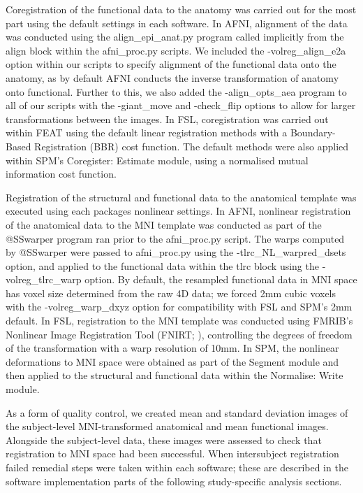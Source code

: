 Coregistration of the functional data to the anatomy was carried out for the most part using the default settings in each software. In AFNI, alignment of the data was conducted using the align\_epi\_anat.py program called implicitly from the align block within the afni\_proc.py scripts. We included the -volreg\_align\_e2a option within our scripts to specify alignment of the functional data onto the anatomy, as by default AFNI conducts the inverse transformation of anatomy onto functional. Further to this, we also added the -align\_opts\_aea program to all of our scripts with the -giant\_move and -check\_flip options to allow for larger transformations between the images. In FSL, coregistration was carried out within FEAT using the default linear registration methods with a Boundary-Based Registration (BBR) cost function. The default methods were also applied within SPM's Coregister: Estimate module, using a normalised mutual information cost function. 

Registration of the structural and functional data to the anatomical template was executed using each packages nonlinear settings. In AFNI, nonlinear registration of the anatomical data to the MNI template was conducted as part of the @SSwarper program ran prior to the afni\_proc.py script. The warps computed by @SSwarper were passed to afni\_proc.py using the -tlrc\_NL\_warpred\_dsets option, and applied to the functional data within the tlrc block using the -volreg\_tlrc\_warp option. By default, the resampled functional data in MNI space has voxel size determined from the raw 4D data; we forced 2mm cubic voxels with the -volreg\_warp\_dxyz option for compatibility with FSL and SPM's 2mm default. In FSL, registration to the MNI template was conducted using FMRIB's Nonlinear Image Registration Tool (FNIRT; \citep{Andersson2007-lc}), controlling the degrees of freedom of the transformation with a warp resolution of 10mm. In SPM, the nonlinear deformations to MNI space were obtained as part of the Segment module and then applied to the structural and functional data within the Normalise: Write module. 

As a form of quality control, we created mean and standard deviation images of the subject-level MNI-transformed anatomical and mean functional images. Alongside the subject-level data, these images were assessed to check that registration to MNI space had been successful. When intersubject registration failed remedial steps were taken within each software; these are described in the software implementation parts of the following study-specific analysis sections. 

